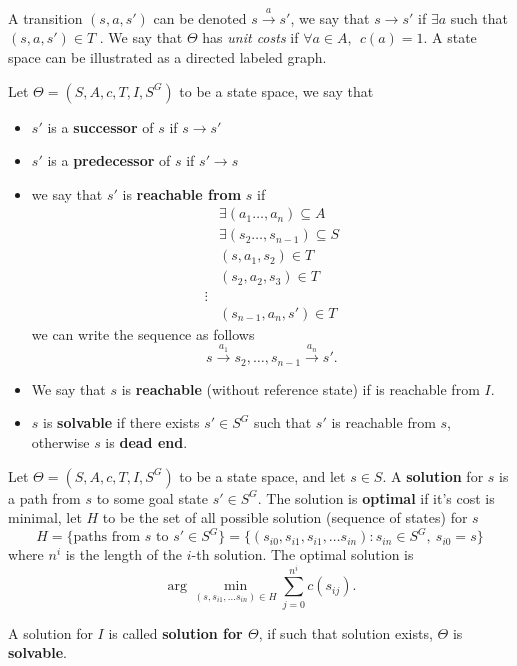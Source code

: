 \documentclass[10pt, letterpaper]{report}
\begin{document}
A transition $(s,a,s')$ can be denoted $s \xrightarrow{a} s'$, we say that $s\rightarrow s'$ if $\exists a$ such that $(s,a,s')\in T$ . We say that $\Theta$ has \textit{unit costs} if $\forall a\in A, \ \ c(a)=1$. A state space can be illustrated as a directed labeled graph. \begin{definition}
    Let $\Theta=(S,A,c,T,I,S^G)$ to be a state space, we say that\begin{itemize}
        \item $s'$ is a \textbf{successor} of $s$ if $s\rightarrow s'$
        \item $s'$ is a \textbf{predecessor} of $s$ if $s'\rightarrow s$
        \item we say that $s'$ is \textbf{reachable from} $s$ if\begin{align}
            &\exists (a_1\dots, a_n)\subseteq A\\
            &\exists (s_2\dots, s_{n-1})\subseteq S\\
            &(s,a_1,s_2)\in T\\
            &(s_2,a_2,s_3)\in T\\
            \vdots \\
            &(s_{n-1},a_n,s')\in T 
        \end{align}
        we can write the sequence as follows\begin{equation}
            s\xrightarrow{a_1}s_2,\dots, s_{n-1}\xrightarrow{a_n}s'.
        \end{equation}
        \item We say that $s$ is \textbf{reachable} (without reference state) if is reachable from $I$.
        \item $s$ is \textbf{solvable} if there exists $s'\in S^G$ such that $s'$ is reachable from $s$, otherwise $s$ is \textbf{dead end}.
    \end{itemize}
\end{definition}
\begin{definition}
    Let $\Theta=(S,A,c,T,I,S^G)$ to be a state space, and let $s\in S$. A \textbf{solution} for $s$ is a path from $s$ to some goal state $s'\in S^G$. The solution is \textbf{optimal} if it's cost is minimal, let $H$ to be the set of all possible solution (sequence of states) for $s$\begin{equation}
        H=\{\text{paths from }s\text{ to }s'\in S^G\}=\{(s_{i0},s_{i1},s_{i1},\dots s_{in})  : s_{in}\in S^G, \ s_{i0}=s\}
    \end{equation}
    where $n^i$ is the length of the $i$-th solution.
    The optimal solution is\begin{equation}
        \arg \min_{(s,s_{i1},\dots s_{in})\in H}\sum_{j=0}^{n^i} c(s_{ij}).
    \end{equation}
\end{definition}
A solution for $I$ is called \textbf{solution for $\Theta$}, if such that solution exists, $\Theta$ is \textbf{solvable}.
\end{document}
